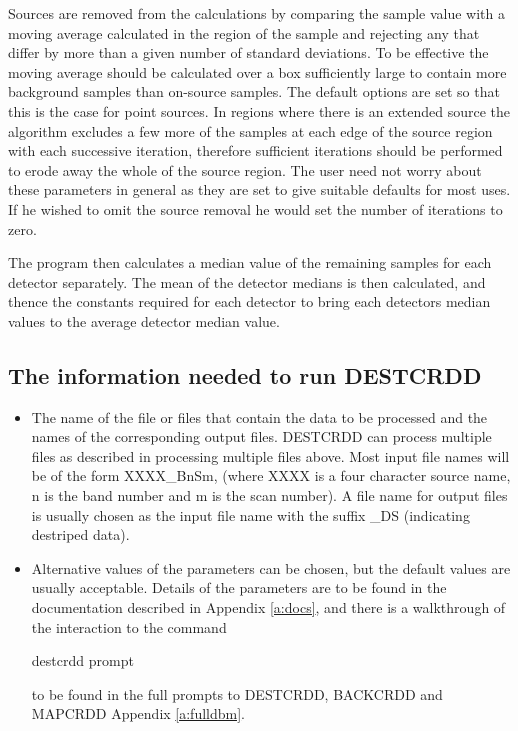 \documentclass[twoside,11pt]{starlink}
\begin{document}
Sources are removed from the calculations by comparing the sample value with
a moving average calculated in the region of the sample and rejecting any that
differ by more than a given number of standard deviations. To be effective the
moving average should be calculated over a box sufficiently large to contain
more background samples than on-source samples. The default  options are set
so that this is the  case for point sources. In regions where there is an
extended source the algorithm excludes a few more of the samples at each edge
of the source region with each successive iteration, therefore sufficient
iterations should be performed to erode away the whole of the source region.
The user need not worry about these parameters in general as they  are set to
give suitable defaults for most uses. If he wished to omit the source removal
he would set the number of iterations to zero.

The program then calculates a median value of the remaining samples for each
detector separately. The mean of the detector medians is then calculated, and
thence the constants required for each detector to bring each detectors median
values to the average detector median value.
\subsection{The information needed to run DESTCRDD}
\begin{itemize}
\item The name of the file or files that contain the data to be processed and
the names of the corresponding output files. DESTCRDD can process multiple
files as described in processing multiple files above. Most input file names
will be of the form XXXX\_BnSm, (where XXXX is a four character source name, n
is the band number and m is the scan number). A file name for output files is
usually chosen as the input file name with the suffix \_DS (indicating destriped
data).
\item Alternative values of the parameters can be chosen, but the default
values are usually acceptable. Details of the parameters are to be found in
the documentation described in Appendix \ref{a:docs}, and there is a
walkthrough of the interaction to the command
\begin{small}
\begin{terminalv}
destcrdd prompt
\end{terminalv}
\end{small}
to be found in the full prompts to DESTCRDD, BACKCRDD and MAPCRDD Appendix
\ref{a:fulldbm}.
\end{itemize}
\end{document}

